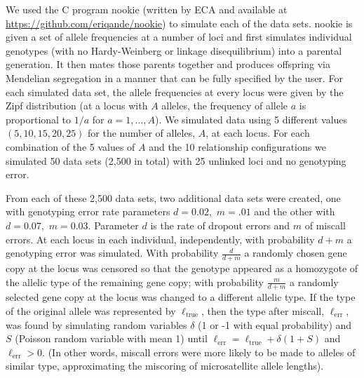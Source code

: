 We used the C program {\sc nookie} (written by ECA and available at \url{https://github.com/eriqande/nookie}) to simulate each of the data sets.  
{\sc nookie} is given a set of allele frequencies at a number of loci and first simulates individual 
genotypes (with no Hardy-Weinberg or linkage disequilibrium) into a parental generation.  It then mates 
those parents together and produces offspring via Mendelian segregation in a manner that can be fully 
specified by the user.  For each simulated data set, the allele frequencies at every locus were given 
by the Zipf distribution (at a locus with $A$ alleles, the frequency of allele $a$ is proportional to 
$1/a$ for $a=1,\ldots,A$). We simulated data using 5 different values $(5,10,15,20,25)$ for the number 
of alleles, $A$, at each locus. For each combination of the 5 values of $A$ and the 10 relationship 
configurations we simulated 50 data sets (2,500 in total)  with 25 unlinked loci and no genotyping 
error.  

From each of these 2,500 data sets, two additional data sets were created, one with genotyping error 
rate parameters $d=0.02$,~$m=.01$ and the other with $d=0.07$,~$m=0.03$.  Parameter $d$ is the rate of dropout 
errors and $m$ of miscall errors.  At each locus in each individual, independently, with probability $d
+m$ a genotyping error was simulated. With probability $\frac{d}{d+m}$ a randomly chosen gene copy at 
the locus was censored so that the genotype appeared as a homozygote of the allelic type of the 
remaining gene copy; with probability $\frac{m}{d+m}$ a randomly selected gene copy at the locus was 
changed to a different allelic type.  If the type of the original allele was represented by $\ell_
\mathrm{true}$, then the type after miscall, $\ell_\mathrm{err}$, was found by simulating random 
variables $\delta$ (1 or -1 with equal probability) and $S$ (Poisson random variable with mean 1) until 
$\ell_\mathrm{err} = \ell_\mathrm{true}+\delta(1+S)$ and $\ell_\mathrm{err}>0$. (In other words, 
miscall errors were more likely to be made to alleles of similar type, approximating the miscoring of 
microsatellite allele lengths).  

